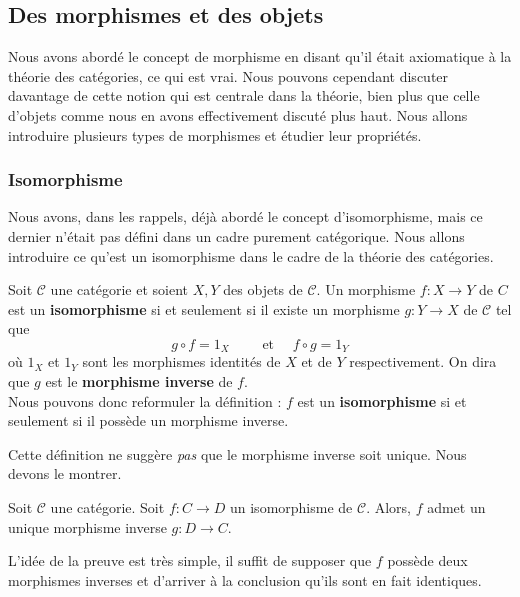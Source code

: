 \documentclass{article}
\begin{document}
\subsection{Des morphismes et des objets}
Nous avons abordé le concept de morphisme en disant qu'il était axiomatique à la théorie des catégories, ce qui est vrai. Nous pouvons cependant discuter davantage de cette notion qui est centrale dans la théorie, bien plus que celle d'objets comme nous en avons effectivement discuté plus haut. Nous allons introduire plusieurs types de morphismes et étudier leur propriétés.

\subsubsection{Isomorphisme}
Nous avons, dans les rappels, déjà abordé le concept d'isomorphisme, mais ce dernier n'était pas défini dans un cadre purement catégorique. Nous allons introduire ce qu'est un isomorphisme dans le cadre de la théorie des catégories.\\

\begin{definition}[Isomorphisme]{}
    Soit $\mathcal C$ une catégorie et soient $X, Y$ des objets de $\mathcal C$. Un morphisme $f:X\to Y$ de $C$ est un \textbf{isomorphisme} si et seulement si il existe un morphisme $g:Y\to X$ de $\mathcal C$ tel que $$g\circ f=1_X\qquad\text{ et }\quad f\circ g=1_Y$$ où $1_X$ et $1_Y$ sont les morphismes identités de $X$ et de $Y$ respectivement. On dira que $g$ est le \textbf{morphisme inverse} de $f$.\\

    \noindent
    Nous pouvons donc reformuler la définition : $f$ est un \textbf{isomorphisme} si et seulement si il possède un morphisme inverse.
\end{definition}

Cette définition ne suggère \textit{pas} que le morphisme inverse soit unique. Nous devons le montrer.

\begin{lemma}{}
    Soit $\mathcal C$ une catégorie. Soit $f:C\to D$ un isomorphisme de $\mathcal C$. Alors, $f$ admet un unique morphisme inverse $g:D\to C$.
\end{lemma}

L'idée de la preuve est très simple, il suffit de supposer que $f$ possède deux morphismes inverses et d'arriver à la conclusion qu'ils sont en fait identiques.
\end{document}
